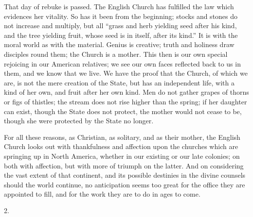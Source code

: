 That day of rebuke is passed. The English Church
has fulfilled the law which evidences her vitality. So has it been
from the beginning; stocks and stones do not increase and multiply,
but all ``grass and herb yielding seed after his kind, and the tree
yielding fruit, whose seed is in itself, after its kind.'' It is with
the moral world as with the material. Genius is creative; truth and
holiness draw disciples round them; the Church is a mother. This then
is our own special rejoicing in our American relatives; we see our own
faces reflected back to us in them, and we know that we live. We have
the proof that the Church, of which we are, is not the mere creation
of the State, but has an independent life, with a kind of her own, and
fruit after her own kind. Men do not gather grapes of thorns or figs
of thistles; the stream does not rise higher than the spring; if her
daughter can exist, though the State does not protect, the mother
would not cease to be, though she were protected by the State no
longer.

For all these reasons, as Christian, as solitary,
and as their mother, the English Church looks out with thankfulness
and affection upon the churches which are springing up in North
America, whether in our existing or our late colonies; on both
with affection, but with more of triumph on the latter. And on
considering the vast extent of that continent, and its possible
destinies in the divine counsels should the world continue, no
anticipation seems too great for the office they are appointed to
fill, and for the work they are to do in ages to come.

2.

